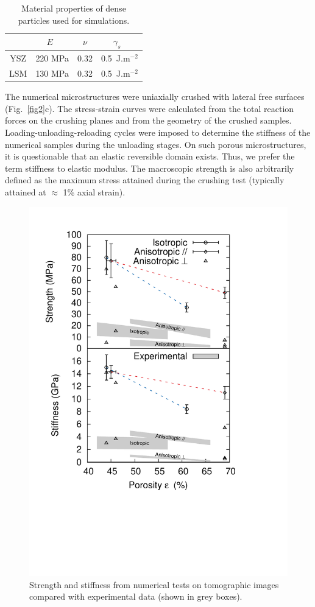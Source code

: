 \documentclass[preprint,12pt,3p]{elsarticle}
\let\oldcite=\cite
\renewcommand\cite[1]{\ifthenelse{\equal{#1}{NEEDED}}{[citation~needed]}{\oldcite{#1}}}
\begin{document}
\begin{table}
	\begin{center}
		\begin{tabular}{cccc}
			\hline
				& $E$~\cite{Giraud08,Selcuk97} & $\nu$ & $\gamma_s$~\cite{Kuo05} \\
			\hline
			YSZ & 220 MPa & 0.32 & 0.5~J.m$^{-2}$ \\
			\hline
			LSM & 130 MPa & 0.32 & 0.5~J.m$^{-2}$ \\
			\hline 
			
		\end{tabular}
	\end{center}
	\caption{\label{table1}Material properties of dense particles used for simulations. }
\end{table}

The numerical microstructures were uniaxially crushed with lateral free surfaces (Fig.~\ref{fig2}c). The stress-strain curves were calculated from the total reaction forces on the crushing planes and from the geometry of the crushed samples. Loading-unloading-reloading cycles were imposed to determine the stiffness of the numerical samples during the unloading stages. On such porous microstructures, it is questionable that an elastic reversible domain exists. Thus, we prefer the term stiffness to elastic modulus. The macroscopic strength is also arbitrarily defined as the maximum stress attained during the crushing test (typically attained at $\approx$ 1\% axial strain).

\begin{figure}
\centering
\includegraphics[width=0.6\linewidth{}]{figures/fig3.pdf}
\caption{Strength and stiffness from numerical tests on tomographic images compared with experimental data (shown in grey boxes).}
\label{fig3}
\end{figure}
\end{document}
